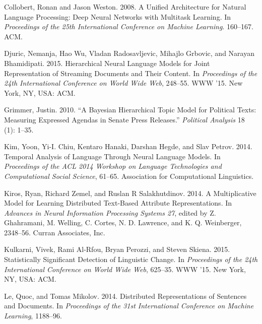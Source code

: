 \documentclass[11pt,letterpaper]{article}
\begin{document}
Collobert, Ronan and Jason Weston. 2008. A Unified Architecture for Natural Language Processing: Deep Neural Networks with Multitask Learning. In \emph{Proceedings of the 25th International Conference on Machine Learning}. 160--167. ACM.

\hypertarget{ref-djuricux5fhierarchicalux5f2015}{}
Djuric, Nemanja, Hao Wu, Vladan Radosavljevic, Mihajlo Grbovic, and
Narayan Bhamidipati. 2015. Hierarchical Neural Language Models for
Joint Representation of Streaming Documents and Their Content. In
\emph{Proceedings of the 24th International Conference on World Wide
Web}, 248--55. WWW '15. New York, NY, USA: ACM.

Grimmer, Justin. 2010. ``A Bayesian Hierarchical Topic Model for Political Texts: Measuring Expressed Agendas in Senate Press Releases.'' \emph{Political Analysis} 18 (1): 1--35.


\hypertarget{ref-kimux5ftemporalux5f2014}{}
Kim, Yoon, Yi-I. Chiu, Kentaro Hanaki, Darshan Hegde, and Slav Petrov.
2014. Temporal Analysis of Language Through Neural Language Models.
In \emph{Proceedings of the ACL 2014 Workshop on Language Technologies
and Computational Social Science}, 61--65. Association for Computational
Linguistics.

\hypertarget{ref-kirosux5fmultiplicativeux5f2014}{}
Kiros, Ryan, Richard Zemel, and Ruslan R Salakhutdinov. 2014. A
Multiplicative Model for Learning Distributed Text-Based Attribute
Representations. In \emph{Advances in Neural Information Processing
Systems 27}, edited by Z. Ghahramani, M. Welling, C. Cortes, N. D.
Lawrence, and K. Q. Weinberger, 2348--56. Curran Associates, Inc.

\hypertarget{ref-kulkarniux5fstatisticallyux5f2015}{}
Kulkarni, Vivek, Rami Al-Rfou, Bryan Perozzi, and Steven Skiena. 2015.
Statistically Significant Detection of Linguistic Change. In
\emph{Proceedings of the 24th International Conference on World Wide
Web}, 625--35. WWW '15. New York, NY, USA: ACM.

\hypertarget{ref-leux5fdistributedux5f2014}{}
Le, Quoc, and Tomas Mikolov. 2014. Distributed Representations of
Sentences and Documents. In \emph{Proceedings of the 31st
International Conference on Machine Learning}, 1188--96.
\end{document}
